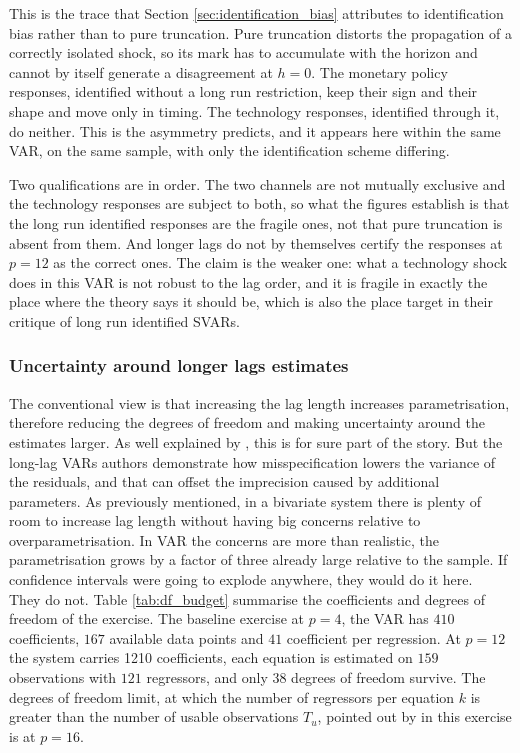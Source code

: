 \documentclass[12pt, a4paper]{article}
\begin{document}
This is the trace that Section \ref{sec:identification_bias} attributes to identification bias
rather than to pure truncation. Pure truncation distorts the propagation of a correctly isolated
shock, so its mark has to accumulate with the horizon and cannot by itself generate a disagreement
at $h = 0$. The monetary policy responses, identified without a long run restriction, keep their 
sign and their shape and move only in timing. The technology responses,
identified through it, do neither. This is the asymmetry \citet{Ravenna2007} predicts, and it
appears here within the same VAR, on the same sample, with only the identification scheme differing.

Two qualifications are in order. The two channels are not mutually exclusive and the technology
responses are subject to both, so what the figures establish is that the long run identified
responses are the fragile ones, not that pure truncation is absent from them. And longer lags do not
by themselves certify the responses at $p = 12$ as the correct ones. The claim is the weaker one:
what a technology shock does in this VAR is not robust to the lag order, and it is fragile in
exactly the place where the theory says it should be, which is also the place
\citet{ChariKehoeMcGrattan2008} target in their critique of long run identified SVARs.

\subsubsection*{Uncertainty around longer lags estimates}
\label{sec:results_uncertainty}
The conventional view is that increasing the lag length increases parametrisation, therefore reducing the 
degrees of freedom and making uncertainty around the estimates larger. As well explained by \citet{Long_Lag2025}, 
this is for sure part of the story.
But the long-lag VARs authors demonstrate how misspecification lowers the variance of the residuals, and that 
can offset the imprecision caused by additional parameters.
As previously mentioned, in a bivariate system there is plenty of room to increase lag length without 
having big concerns relative to overparametrisation. In \citet{ACEL2011} VAR the concerns are more than realistic, 
the parametrisation grows by a factor of three already large relative to the sample.
If confidence intervals were going to explode anywhere, they would do it here.
\\

They do not.
Table \ref{tab:df_budget} summarise the coefficients and degrees of freedom of the exercise.
The baseline exercise at $p = 4$, the VAR has $410$ coefficients, $167$ available data points and $41$ 
coefficient per regression.
At $p = 12$ the system carries 1210 coefficients, each equation is estimated on $159$ observations with 
$121$ regressors, and only 38 degrees of freedom survive.
The degrees of freedom limit, at which the number of regressors per equation $k$ is greater than the number 
of usable observations $T_u$, pointed out by \citet{Long_Lag2025} in this exercise is at $p = 16$.
\end{document}
